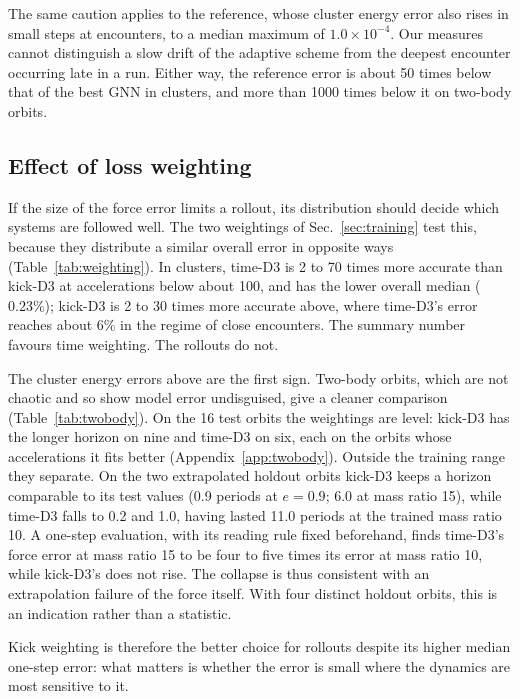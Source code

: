 \documentclass[a4paper,journal]{IEEEtran}
\begin{document}
The same caution applies to the reference, whose cluster energy error also rises in small steps at encounters, to a median maximum of $1.0\times10^{-4}$. Our measures cannot distinguish a slow drift of the adaptive scheme from the deepest encounter occurring late in a run. Either way, the reference error is about 50 times below that of the best GNN in clusters, and more than 1000 times below it on two-body orbits.

\subsection{Effect of loss weighting}\label{sec:where}

If the size of the force error limits a rollout, its distribution should decide which systems are followed well. The two weightings of Sec.~\ref{sec:training} test this, because they distribute a similar overall error in opposite ways (Table~\ref{tab:weighting}). In clusters, time-D3 is 2 to 70 times more accurate than kick-D3 at accelerations below about 100, and has the lower overall median ($0.23\%$); kick-D3 is 2 to 30 times more accurate above, where time-D3's error reaches about $6\%$ in the regime of close encounters. The summary number favours time weighting. The rollouts do not.

The cluster energy errors above are the first sign. Two-body orbits, which are not chaotic and so show model error undisguised, give a cleaner comparison (Table~\ref{tab:twobody}). On the 16 test orbits the weightings are level: kick-D3 has the longer horizon on nine and time-D3 on six, each on the orbits whose accelerations it fits better (Appendix~\ref{app:twobody}). Outside the training range they separate. On the two extrapolated holdout orbits kick-D3 keeps a horizon comparable to its test values (0.9 periods at $e=0.9$; 6.0 at mass ratio 15), while time-D3 falls to 0.2 and 1.0, having lasted 11.0 periods at the trained mass ratio 10. A one-step evaluation, with its reading rule fixed beforehand, finds time-D3's force error at mass ratio 15 to be four to five times its error at mass ratio 10, while kick-D3's does not rise. The collapse is thus consistent with an extrapolation failure of the force itself. With four distinct holdout orbits, this is an indication rather than a statistic.

Kick weighting is therefore the better choice for rollouts despite its higher median one-step error: what matters is whether the error is small where the dynamics are most sensitive to it.
\end{document}
